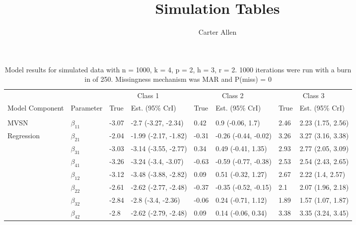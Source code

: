 \documentclass[]{article}
\title{Simulation Tables}
\author{Carter Allen}
\date{}
\begin{document}
\maketitle

\begin{table}[t]

\caption{\label{tab:unnamed-chunk-4}Model results for simulated data with n = 1000, k = 4, p = 2, h = 3, r = 2. 1000 iterations were run with a burn in of 250. Missingness mechanism was MAR and P(miss) = 0}
\centering
\fontsize{8}{10}\selectfont
\begin{tabular}{llllllll}
\toprule
\multicolumn{2}{c}{ } & \multicolumn{2}{c}{Class 1} & \multicolumn{2}{c}{Class 2} & \multicolumn{2}{c}{Class 3} \\
\cmidrule(l{3pt}r{3pt}){3-4} \cmidrule(l{3pt}r{3pt}){5-6} \cmidrule(l{3pt}r{3pt}){7-8}
Model Component & Parameter & True & Est. (95\% CrI) & True & Est. (95\% CrI) & True & Est. (95\% CrI)\\
\midrule
\addlinespace[0.3em]
\multicolumn{8}{l}{\textbf{ }}\\
\hspace{1em}MVSN & $\beta_{11}$ & -3.07 & -2.7 (-3.27, -2.34) & 0.42 & 0.9 (-0.06, 1.7) & 2.46 & 2.23 (1.75, 2.56)\\
\hspace{1em}Regression & $\beta_{21}$ & -2.04 & -1.99 (-2.17, -1.82) & -0.31 & -0.26 (-0.44, -0.02) & 3.26 & 3.27 (3.16, 3.38)\\
\hspace{1em} & $\beta_{31}$ & -3.03 & -3.14 (-3.55, -2.77) & 0.34 & 0.49 (-0.41, 1.35) & 2.93 & 2.77 (2.05, 3.09)\\
\hspace{1em} & $\beta_{41}$ & -3.26 & -3.24 (-3.4, -3.07) & -0.63 & -0.59 (-0.77, -0.38) & 2.53 & 2.54 (2.43, 2.65)\\
\hspace{1em} & $\beta_{12}$ & -3.12 & -3.48 (-3.88, -2.82) & 0.09 & 0.51 (-0.32, 1.27) & 2.67 & 2.22 (1.4, 2.57)\\
\hspace{1em} & $\beta_{22}$ & -2.61 & -2.62 (-2.77, -2.48) & -0.37 & -0.35 (-0.52, -0.15) & 2.1 & 2.07 (1.96, 2.18)\\
\hspace{1em} & $\beta_{32}$ & -2.84 & -2.8 (-3.4, -2.36) & -0.06 & 0.24 (-0.71, 1.12) & 1.89 & 1.57 (1.07, 1.87)\\
\hspace{1em} & $\beta_{42}$ & -2.8 & -2.62 (-2.79, -2.48) & 0.09 & 0.14 (-0.06, 0.34) & 3.38 & 3.35 (3.24, 3.45)\\

\end{tabular}
\end{table}
\end{document}
